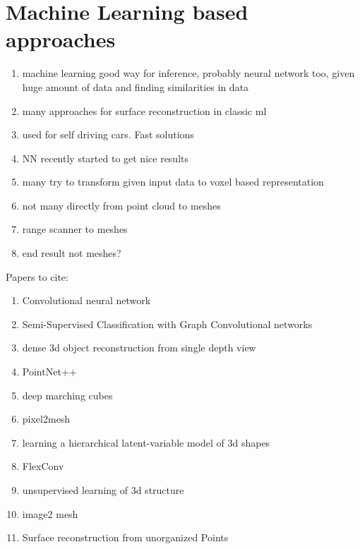 \section{Machine Learning based approaches}
\label{ml_approaches}
\begin{enumerate}
  \item machine learning good way for inference, probably neural network too, given huge amount of data and finding similarities in data
  \item many approaches for surface reconstruction in classic ml
  \item used for self driving cars. Fast solutions
  \item NN recently started to get nice results
  \item many try to transform given input data to voxel based representation
  \item not many directly from point cloud to meshes
  \item range scanner to meshes
  \item end result not meshes?
\end{enumerate}
Papers to cite:
\begin{enumerate}
  \item Convolutional neural network
  \item Semi-Supervised Classification with Graph Convolutional networks
  \item dense 3d object reconstruction from single depth view
  \item PointNet++
  \item deep marching cubes
  \item pixel2mesh
  \item learning a hierarchical latent-variable model of 3d shapes
  \item FlexConv
  \item unsupervised learning of 3d structure
  \item image2 mesh
  \item Surface reconstruction from unorganized Points
\end{enumerate}
